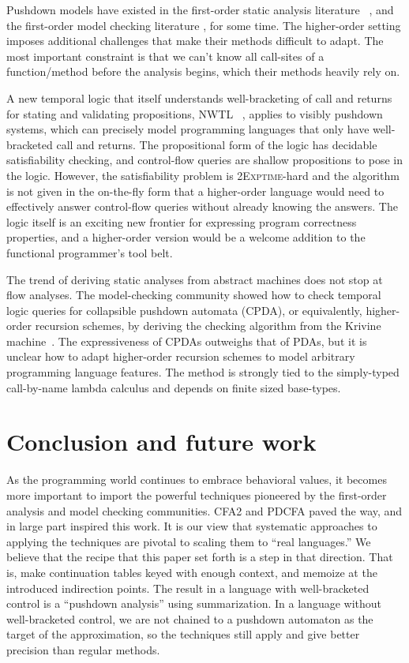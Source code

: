 Pushdown models have existed in the first-order static analysis literature ~\citep[Chapter 7]{local:muchnick:jones:flow-analysis:1981}\citep{ianjohnson:reps:pushdown:1995}, and the first-order model checking literature \citep{ianjohnson:bouajiani:esparza:pushdown:1997}, for some time.
%
The higher-order setting imposes additional challenges that make their methods difficult to adapt.
%
The most important constraint is that we can't know all call-sites of a function/method before the analysis begins, which their methods heavily rely on.

A new temporal logic that itself understands well-bracketing of call and returns for stating and validating propositions, NWTL ~\citep{ianjohnson:alur:nwtl:2007}, applies to visibly pushdown systems, which can precisely model programming languages that only have well-bracketed call and returns.
%
The propositional form of the logic has decidable satisfiability checking, and control-flow queries are shallow propositions to pose in the logic.
%
However, the satisfiability problem is \textsc{2Exptime}-hard and the algorithm is not given in the on-the-fly form that a higher-order language would need to effectively answer control-flow queries without already knowing the answers.
%
The logic itself is an exciting new frontier for expressing program correctness properties, and a higher-order version would be a welcome addition to the functional programmer's tool belt.

The trend of deriving static analyses from abstract machines does not stop at flow analyses.
%
The model-checking community showed how to check temporal logic queries for collapsible pushdown automata (CPDA), or equivalently, higher-order recursion schemes, by deriving the checking algorithm from the Krivine machine~\citep{ianjohnson:Salvati:2011:KMH:2027223.2027239}.
%
The expressiveness of CPDAs outweighs that of PDAs, but it is unclear how to adapt higher-order recursion schemes to model arbitrary programming language features.
%
The method is strongly tied to the simply-typed call-by-name lambda calculus and depends on finite sized base-types.

\section{Conclusion and future work}

As the programming world continues to embrace behavioral values, it becomes more important to import the powerful techniques pioneered by the first-order analysis and model checking communities.
%
CFA2 and PDCFA paved the way, and in large part inspired this work.
%
It is our view that systematic approaches to applying the techniques are pivotal to scaling them to ``real languages.''
%
We believe that the recipe that this paper set forth is a step in that direction.
%
That is, make continuation tables keyed with enough context, and memoize at the introduced indirection points.
%
The result in a language with well-bracketed control is a ``pushdown analysis'' using summarization.
%
In a language without well-bracketed control, we are not chained to a pushdown automaton as the target of the approximation, so the techniques still apply and give better precision than regular methods.

